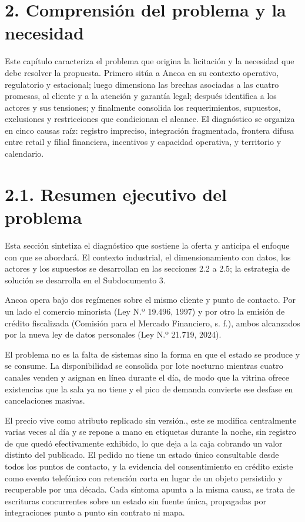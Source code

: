 \documentclass[11pt]{article}
\begin{document}
\section{2. Comprensión del problema y la necesidad}\label{comprension-del-problema-y-la-necesidad}

Este capítulo caracteriza el problema que origina la licitación y la necesidad que debe resolver la propuesta. Primero sitúa a Ancoa en su contexto operativo, regulatorio y estacional; luego dimensiona las brechas asociadas a las cuatro promesas, al cliente y a la atención y garantía legal; después identifica a los actores y sus tensiones; y finalmente consolida los requerimientos, supuestos, exclusiones y restricciones que condicionan el alcance. El diagnóstico se organiza en cinco causas raíz: registro impreciso, integración fragmentada, frontera difusa entre retail y filial financiera, incentivos y capacidad operativa, y territorio y calendario.

\section{2.1. Resumen ejecutivo del problema}\label{resumen-ejecutivo-del-problema}

Esta sección sintetiza el diagnóstico que sostiene la oferta y anticipa el enfoque con que se abordará. El contexto industrial, el dimensionamiento con datos, los actores y los supuestos se desarrollan en las secciones 2.2 a 2.5; la estrategia de solución se desarrolla en el Subdocumento 3.

Ancoa opera bajo dos regímenes sobre el mismo cliente y punto de contacto. Por un lado el comercio minorista (Ley N.º 19.496, 1997) y por otro la emisión de crédito fiscalizada (Comisión para el Mercado Financiero, s. f.), ambos alcanzados por la nueva ley de datos personales (Ley N.º 21.719, 2024).

El problema no es la falta de sistemas sino la forma en que el estado se produce y se consume. La disponibilidad se consolida por lote nocturno mientras cuatro canales venden y asignan en línea durante el día, de modo que la vitrina ofrece existencias que la sala ya no tiene y el pico de demanda convierte ese desfase en cancelaciones masivas.

El precio vive como atributo replicado sin versión., este se modifica centralmente varias veces al día y se repone a mano en etiquetas durante la noche, sin registro de que quedó efectivamente exhibido, lo que deja a la caja cobrando un valor distinto del publicado. El pedido no tiene un estado único consultable desde todos los puntos de contacto, y la evidencia del consentimiento en crédito existe como evento telefónico con retención corta en lugar de un objeto persistido y recuperable por una década. Cada síntoma apunta a la misma causa, se trata de escrituras concurrentes sobre un estado sin fuente única, propagadas por integraciones punto a punto sin contrato ni mapa.
\end{document}
